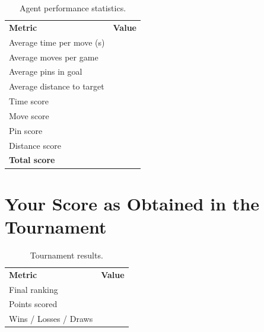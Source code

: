 \documentclass[11pt, a4paper]{article}
\begin{document}
\begin{table}[H]
    \centering
    \renewcommand{\arraystretch}{1.4}
    \begin{tabular}{L{7.5cm} C{4cm}}
        \color{white}\textbf{Metric} & \color{white}\textbf{Value} \\
        Average time per move (s)  & \\
        Average moves per game     & \\
        Average pins in goal       & \\
        Average distance to target & \\
        Time score                 & \\
        Move score                 & \\
        Pin score                  & \\
        Distance score             & \\
        \textbf{Total score}       & \\
    \end{tabular}
    \caption{Agent performance statistics.}
\end{table}


\section{Your Score as Obtained in the Tournament}

\begin{table}[H]
    \centering
    \renewcommand{\arraystretch}{1.4}
    \begin{tabular}{L{7.5cm} C{4cm}}
        \color{white}\textbf{Metric} & \color{white}\textbf{Value} \\
        Final ranking         & \\
        Points scored         & \\
        Wins / Losses / Draws & \\
    \end{tabular}
    \caption{Tournament results.}
\end{table}
\end{document}

